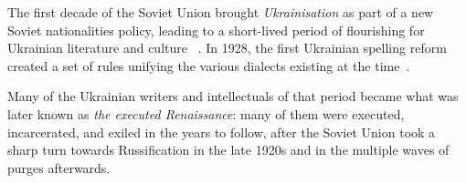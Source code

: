 The first decade of the Soviet Union brought \emph{Ukrainisation} as part of
a new Soviet nationalities policy, leading to a short-lived period of
flourishing for Ukrainian literature and culture%
~\cite{5c48fce9-c05d-3d4e-94c1-cd6079bff660}. 
In 1928, the first Ukrainian spelling reform 
created a set of rules unifying the various dialects existing at the time~\cite{karunyk2017ukrainian}.

Many of the Ukrainian writers and intellectuals of that period became
what was later known as \textit{the executed
Renaissance}:
%
many of them were executed, incarcerated, and exiled in the years to
follow,
after the Soviet Union took a sharp
turn towards Russification in the late 1920s and in the multiple waves
of purges afterwards.

